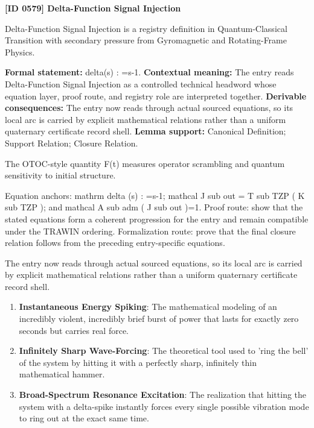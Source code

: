 \clearpage
\noindent\textbf{[ID 0579] Delta-Function Signal Injection}\par
\vspace{0.35em}
\begingroup\small
{}
Delta-Function Signal Injection is a registry definition in Quantum-Classical Transition with secondary pressure from Gyromagnetic and Rotating-Frame Physics.

\begingroup\footnotesize\setlength{\emergencystretch}{3em}\sloppy
\textbf{Formal statement:} delta(s) : =s-1. \textbf{Contextual meaning:} The entry reads Delta-Function Signal Injection as a controlled technical headword whose equation layer, proof route, and registry role are interpreted together. \textbf{Derivable consequences:} The entry now reads through actual sourced equations, so its local arc is carried by explicit mathematical relations rather than a uniform quaternary certificate record shell. \textbf{Lemma support:} Canonical Definition; Support Relation; Closure Relation.\par
\endgroup

The OTOC-style quantity F(t) measures operator scrambling and quantum sensitivity to initial structure.

Equation anchors: mathrm delta (s) : =s-1; mathcal J sub out = T sub TZP ( K sub TZP ); and mathcal A sub adm ( J sub out )=1. Proof route: show that the stated equations form a coherent progression for the entry and remain compatible under the TRAWIN ordering. Formalization route: prove that the final closure relation follows from the preceding entry-specific equations.

The entry now reads through actual sourced equations, so its local arc is carried by explicit mathematical relations rather than a uniform quaternary certificate record shell.
\endgroup

\begin{enumerate}[leftmargin=1.6em,itemsep=6pt,topsep=4pt]
\item \textbf{Instantaneous Energy Spiking}: The mathematical modeling of an incredibly violent, incredibly brief burst of power that lasts for exactly zero seconds but carries real force.
\item \textbf{Infinitely Sharp Wave-Forcing}: The theoretical tool used to 'ring the bell' of the system by hitting it with a perfectly sharp, infinitely thin mathematical hammer.
\item \textbf{Broad-Spectrum Resonance Excitation}: The realization that hitting the system with a delta-spike instantly forces every single possible vibration mode to ring out at the exact same time.
\end{enumerate}

